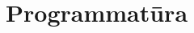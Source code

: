 \documentclass[hidelinks, a4paper, 12pt]{article}
\begin{document}
\section{Programmatūra}


\end{document}
